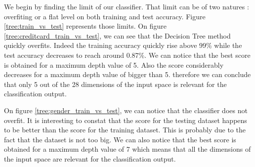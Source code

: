 \documentclass[10pt]{article}
\begin{document}
			We begin by finding the limit of our classifier. That limit can be of two natures : overfiting or a flat level on both training and test accuracy. Figure \ref{tree:train_vs_test} represents those limits. On figure \ref{tree:creditcard_train_vs_test}, we can see that the Decision Tree method quickly overfits. Indeed the training accuracy quickly rise above 99\% while the test accuracy decreases to reach around 0.87\%. We can notice that the best score is obtained for a maximum depth value of 5. Also the score considerably decreases for a maximum depth value of bigger than 5. therefore we can conclude that only 5 out of the 28 dimensions of the input space is relevant for the classification output.

			On figure \ref{tree:gender_train_vs_test}, we can notice that the classifier does not overfit. It is interesting to constat that the score for the testing dataset happens to be better than the score for the training dataset. This is probably due to the fact that the dataset is not too big. We can also notice that the best score is obtained for a maximum depth value of 7 which means that all the dimensions of the input space are relevant for the classification output.
\end{document}
